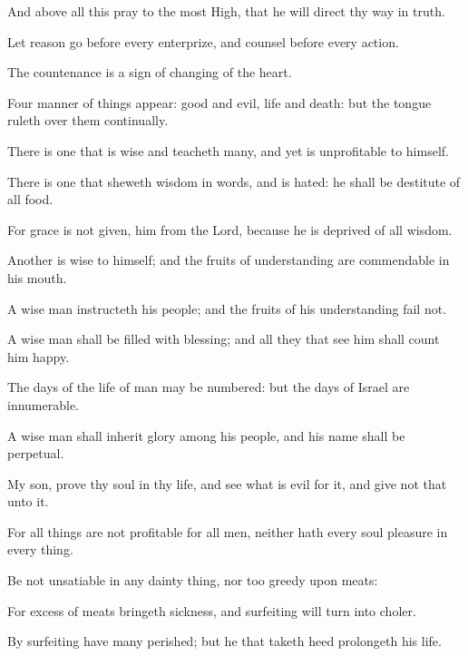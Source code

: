 {\par }{\PP {}And above all this pray to the most High, that he will direct thy way in truth.
\par }{\PP {}Let reason go before every enterprize, and counsel before every action.
\par }{\PP {}The countenance is a sign of changing of the heart.
\par }{\PP {}Four manner of things appear: good and evil, life and death: but the tongue ruleth over them continually.
\par }{\PP {}There is one that is wise and teacheth many, and yet is unprofitable to himself.
\par }{\PP {}There is one that sheweth wisdom in words, and is hated: he shall be destitute of all food.
\par }{\PP {}For grace is not given, him from the Lord, because he is deprived of all wisdom.
\par }{\PP {}Another is wise to himself; and the fruits of understanding are commendable in his mouth.
\par }{\PP {}A wise man instructeth his people; and the fruits of his understanding fail not.
\par }{\PP {}A wise man shall be filled with blessing; and all they that see him shall count him happy.
\par }{\PP {}The days of the life of man may be numbered: but the days of Israel are innumerable.
\par }{\PP {}A wise man shall inherit glory among his people, and his name shall be perpetual.
\par }{\PP {}My son, prove thy soul in thy life, and see what is evil for it, and give not that unto it.
\par }{\PP {}For all things are not profitable for all men, neither hath every soul pleasure in every thing.
\par }{\PP {}Be not unsatiable in any dainty thing, nor too greedy upon meats:
\par }{\PP {}For excess of meats bringeth sickness, and surfeiting will turn into choler.
\par }{\PP {}By surfeiting have many perished; but he that taketh heed prolongeth his life.

}
